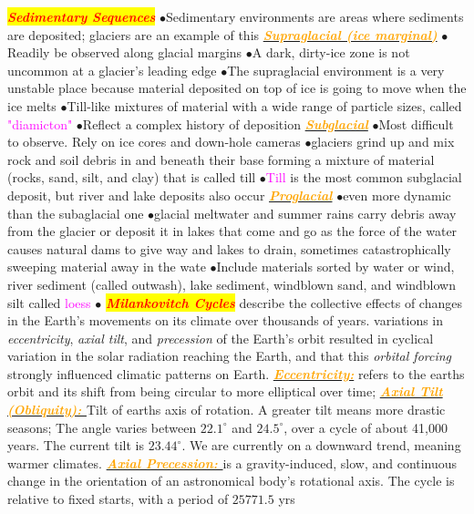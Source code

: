 \documentclass{article}
\newcommand{\ddd}{$\bullet$}
\newcommand{\red}[1]{\textcolor{red}{#1}}
\newcommand{\pink}[1]{\textcolor{magenta}{#1}}
\newcommand{\orange}[1]{\textcolor{orange}{#1}}
\newcommand{\mysection}[1]{\colorbox{yellow}{\textbf{\textit{\red{#1}}}}}
\newcommand{\mysub}[1]{\underline{\textbf{{\textit{\orange{#1}}}}}}
\newcommand{\vocab}[1]{{\pink{#1}}}
\begin{document}
\begin{multicols*}{4}
        \mysection{Sedimentary Sequences}
        \ddd Sedimentary environments are areas where sediments are deposited; glaciers are an example of this
        \mysub{Supraglacial (ice marginal)}
            \ddd Readily be observed along glacial margins
            \ddd A dark, dirty-ice zone is not uncommon at a glacier’s leading edge
            \ddd The supraglacial environment is a very unstable place because material deposited on top of ice is going to move when the ice melts
            \ddd Till-like mixtures of material with a wide range of particle sizes, called \vocab{"diamicton"}
            \ddd Reflect a complex history of deposition
        \mysub{Subglacial}
            \ddd Most difficult to observe. Rely on ice cores and down-hole cameras 
            \ddd glaciers grind up and mix rock and soil debris in and beneath their base forming a mixture of material (rocks, sand, silt, and clay) that is called till
            \ddd \vocab{Till} is the most common subglacial deposit, but river and lake deposits also occur 
        \mysub{Proglacial}
            \ddd even more dynamic than the subaglacial one
            \ddd glacial meltwater and summer rains carry debris away from the glacier or deposit it in lakes that come and go as the force of the water causes natural dams to give way and lakes to drain, sometimes catastrophically sweeping material away in the wate
            \ddd Include materials sorted by water or wind, river sediment (called outwash), lake sediment, windblown sand, and windblown silt called \vocab{loess} \ddd
        \mysection{Milankovitch Cycles}
         describe the collective effects of changes in the Earth's movements on its climate over thousands of years. variations in \textit{eccentricity}, \textit{axial tilt}, and \textit{precession} of the Earth's orbit resulted in cyclical variation in the solar radiation reaching the Earth, and that this \textit{orbital forcing} strongly influenced climatic patterns on Earth.
         \mysub{Eccentricity:} refers to the earths orbit and its shift from being circular to more elliptical over time;
        \mysub{Axial Tilt (Obliquity): }Tilt of earths axis of rotation. A greater tilt means more drastic seasons; The angle varies between $22.1^\circ$ and $24.5^\circ$, over a cycle of about 41,000 years. The current tilt is $23.44^\circ$. We are currently on a downward trend, meaning warmer climates.
        \mysub{Axial Precession: } is a gravity-induced, slow, and continuous change in the orientation of an astronomical body's rotational axis. The cycle is relative to fixed starts, with a period of $25771.5$ yrs

\end{multicols*}
\end{document}
